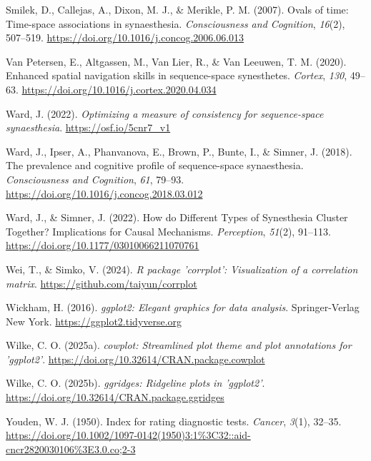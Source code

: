 \documentclass[
  man,
  floatsintext,
  longtable,
  a4paper,
  nolmodern,
  notxfonts,
  notimes,
  colorlinks=true,linkcolor=blue,citecolor=blue,urlcolor=blue]{apa7}
\newlength{\cslhangindent}
\newenvironment{CSLReferences}[2] %
 {\begin{list}{}{%
  \setlength{\itemindent}{0pt}
  \setlength{\leftmargin}{0pt}
  \setlength{\parsep}{0pt}
  \ifodd #1
   \setlength{\leftmargin}{\cslhangindent}
   \setlength{\itemindent}{-1\cslhangindent}
  \fi
  \setlength{\itemsep}{#2\baselineskip}}}
 {\end{list}}
\begin{document}
\begin{CSLReferences}{1}{0}
Smilek, D., Callejas, A., Dixon, M. J., \& Merikle, P. M. (2007). Ovals
of time: Time-space associations in synaesthesia. \emph{Consciousness
and Cognition}, \emph{16}(2), 507--519.
\url{https://doi.org/10.1016/j.concog.2006.06.013}

Van Petersen, E., Altgassen, M., Van Lier, R., \& Van Leeuwen, T. M.
(2020). Enhanced spatial navigation skills in sequence-space
synesthetes. \emph{Cortex}, \emph{130}, 49--63.
\url{https://doi.org/10.1016/j.cortex.2020.04.034}

Ward, J. (2022). \emph{Optimizing a measure of consistency for
sequence-space synaesthesia}. \url{https://osf.io/5cnr7_v1}

Ward, J., Ipser, A., Phanvanova, E., Brown, P., Bunte, I., \& Simner, J.
(2018). The prevalence and cognitive profile of sequence-space
synaesthesia. \emph{Consciousness and Cognition}, \emph{61}, 79--93.
\url{https://doi.org/10.1016/j.concog.2018.03.012}

Ward, J., \& Simner, J. (2022). How do Different Types of Synesthesia
Cluster Together? Implications for Causal Mechanisms. \emph{Perception},
\emph{51}(2), 91--113. \url{https://doi.org/10.1177/03010066211070761}

Wei, T., \& Simko, V. (2024). \emph{R package '{corrplot}':
Visualization of a correlation matrix}.
\url{https://github.com/taiyun/corrplot}

Wickham, H. (2016). \emph{{ggplot2}: Elegant graphics for data
analysis}. Springer-Verlag New York. \url{https://ggplot2.tidyverse.org}

Wilke, C. O. (2025a). \emph{{cowplot}: Streamlined plot theme and plot
annotations for 'ggplot2'}.
\url{https://doi.org/10.32614/CRAN.package.cowplot}

Wilke, C. O. (2025b). \emph{{ggridges}: Ridgeline plots in 'ggplot2'}.
\url{https://doi.org/10.32614/CRAN.package.ggridges}

Youden, W. J. (1950). Index for rating diagnostic tests. \emph{Cancer},
\emph{3}(1), 32--35.
\url{https://doi.org/10.1002/1097-0142(1950)3:1\%3C32::aid-cncr2820030106\%3E3.0.co;2-3}

\end{CSLReferences}
\end{document}
